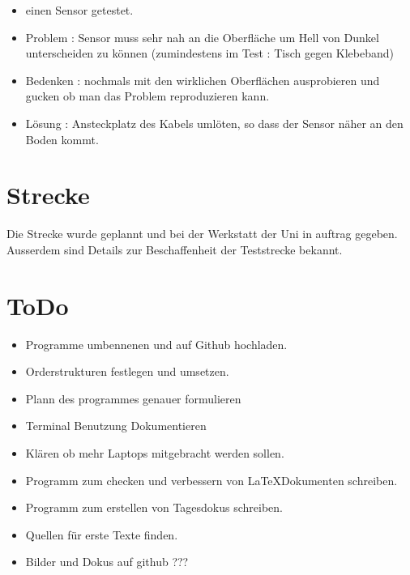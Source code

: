 \documentclass{article}
\begin{document}
\begin{itemize}

\item einen Sensor getestet.

\item Problem : Sensor muss sehr nah an die Oberfl\"{a}che um Hell von Dunkel unterscheiden zu k\"{o}nnen (zumindestens im Test : Tisch gegen Klebeband)

\item Bedenken : nochmals mit den wirklichen Oberfl\"{a}chen ausprobieren und gucken ob man das Problem reproduzieren kann.

\item L\"{o}sung : Ansteckplatz des Kabels uml\"{o}ten, so dass der Sensor n\"{a}her an den Boden kommt.

\end{itemize}

\section{Strecke}

Die Strecke wurde geplannt und bei der Werkstatt der Uni in auftrag gegeben. Ausserdem sind Details zur Beschaffenheit der Teststrecke bekannt.

\section{ToDo}

\begin{itemize}

\item Programme umbennenen und auf Github hochladen.

\item Orderstrukturen festlegen und umsetzen.

\item Plann des programmes genauer formulieren

\item Terminal Benutzung Dokumentieren

\item Kl\"{a}ren ob mehr Laptops mitgebracht werden sollen.

\item Programm zum checken und verbessern von \LaTeX Dokumenten schreiben.

\item Programm zum erstellen von Tagesdokus schreiben.

\item Quellen f\"{u}r erste Texte finden.

\item Bilder und Dokus auf github ???

\end{itemize}
\end{document}
